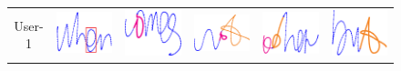 \begin{figure}[!t]
\centering
\begin{tabular}{cccccc}
\hline 
\vspace{2mm}
User-1
&
{\includegraphics[width=0.09\columnwidth]{./Graphic/words_jing/1001_pdfCopy.eps}}
& 
{\includegraphics[width=0.09\columnwidth]{./Graphic/words_jing/1003_pdfCopy.eps}}
& 
{\includegraphics[width=0.09\columnwidth]{./Graphic/words_jing/1008_pdfCopy.eps}}
& 
{\includegraphics[width=0.09\columnwidth]{./Graphic/words_jing/1011_pdfCopy.eps}}
& 
{\includegraphics[width=0.09\columnwidth]{./Graphic/words_jing/1014_pdfCopy.eps}}
\\ 


\end{tabular}
\end{figure}
